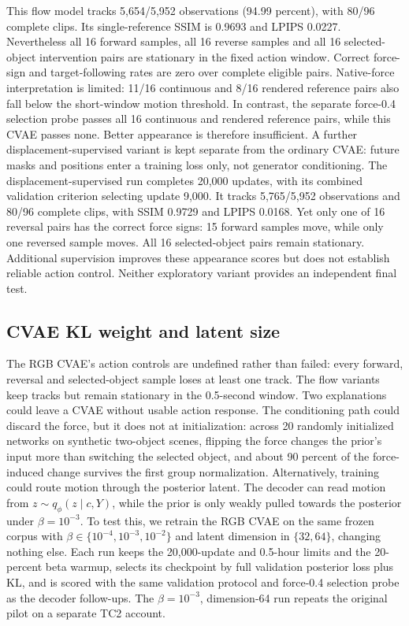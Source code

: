 \documentclass[11pt,a4paper]{article}
\begin{document}
This flow model tracks 5,654/5,952 observations (94.99 percent), with 80/96 complete clips. Its single-reference SSIM is 0.9693 and LPIPS 0.0227. Nevertheless all 16 forward samples, all 16 reverse samples and all 16 selected-object intervention pairs are stationary in the fixed action window. Correct force-sign and target-following rates are zero over complete eligible pairs. Native-force interpretation is limited: 11/16 continuous and 8/16 rendered reference pairs also fall below the short-window motion threshold. In contrast, the separate force-0.4 selection probe passes all 16 continuous and rendered reference pairs, while this CVAE passes none. Better appearance is therefore insufficient. A further displacement-supervised variant is kept separate from the ordinary CVAE: future masks and positions enter a training loss only, not generator conditioning. The displacement-supervised run completes 20,000 updates, with its combined validation criterion selecting update 9,000. It tracks 5,765/5,952 observations and 80/96 complete clips, with SSIM 0.9729 and LPIPS 0.0168. Yet only one of 16 reversal pairs has the correct force signs: 15 forward samples move, while only one reversed sample moves. All 16 selected-object pairs remain stationary. Additional supervision improves these appearance scores but does not establish reliable action control. Neither exploratory variant provides an independent final test.

\subsection{CVAE KL weight and latent size}
\label{sec:cvae_study}
The RGB CVAE's action controls are undefined rather than failed: every forward, reversal and selected-object sample loses at least one track. The flow variants keep tracks but remain stationary in the 0.5-second window. Two explanations could leave a CVAE without usable action response. The conditioning path could discard the force, but it does not at initialization: across 20 randomly initialized networks on synthetic two-object scenes, flipping the force changes the prior's input more than switching the selected object, and about 90 percent of the force-induced change survives the first group normalization. Alternatively, training could route motion through the posterior latent. The decoder can read motion from $z\sim q_\phi(z\mid c,Y)$, while the prior is only weakly pulled towards the posterior under $\beta=10^{-3}$. To test this, we retrain the RGB CVAE on the same frozen corpus with $\beta\in\{10^{-4},10^{-3},10^{-2}\}$ and latent dimension in $\{32,64\}$, changing nothing else. Each run keeps the 20,000-update and 0.5-hour limits and the 20-percent beta warmup, selects its checkpoint by full validation posterior loss plus KL, and is scored with the same validation protocol and force-0.4 selection probe as the decoder follow-ups. The $\beta=10^{-3}$, dimension-64 run repeats the original pilot on a separate TC2 account.
\end{document}
